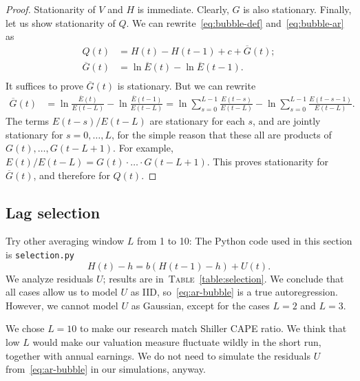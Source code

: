 \documentclass[12pt]{amsart}
\begin{document}
\begin{proof}
Stationarity of $V$ and $H$ is immediate. Clearly, $G$ is also stationary. Finally, let us show stationarity of $Q$. We can rewrite~\eqref{eq:bubble-def} and~\eqref{eq:bubble-ar} as
\begin{align*}
Q(t) &= H(t) - H(t-1) + c + \overline{G}(t);\\
\overline{G}(t) &= \ln\overline{E}(t) - \ln\overline{E}(t-1).\\
\end{align*}
It suffices to prove $\overline{G}(t)$ is stationary. But we can rewrite
\begin{align*}
\overline{G}(t) &= \ln\frac{\overline{E}(t)}{E(t-L)} - \ln\frac{\overline{E}(t-1)}{E(t-L)}  = \ln\sum\limits_{s=0}^{L-1}\frac{E(t-s)}{E(t-L)} - \ln\sum\limits_{s=0}^{L-1}\frac{E(t-s-1)}{E(t-L)}.
\end{align*}
The terms $E(t-s)/E(t-L)$ are stationary for each $s$, and are jointly stationary for $s = 0, \ldots, L$, for the simple reason that these  all are products of $G(t), \ldots, G(t-L+1)$. For example, $E(t)/E(t-L) = G(t)\cdot\ldots\cdot G(t-L+1)$. This proves stationarity for $\overline{G}(t)$, and therefore for $Q(t)$. 
\end{proof}

\subsection{Lag selection} Try other averaging window $L$ from 1 to 10: The Python code used in this section is \texttt{selection.py}
\begin{equation}
\label{eq:ar-bubble}
H(t) - h = b(H(t-1) - h) + U(t).
\end{equation}
We analyze residuals $U$; results are in~\textsc{Table}~\ref{table:selection}. We conclude that all cases allow us to model $U$ as IID, so~\eqref{eq:ar-bubble} is a true autoregression. However,  we cannot model $U$ as Gaussian, except for the cases $L = 2$ and $L = 3$. 

We chose $L = 10$ to make our research match Shiller CAPE ratio. We think that low $L$ would make our valuation measure fluctuate wildly in the short run, together with annual earnings. We do not need to simulate the residuals $U$ from~\eqref{eq:ar-bubble} in our simulations, anyway. 
\end{document}
